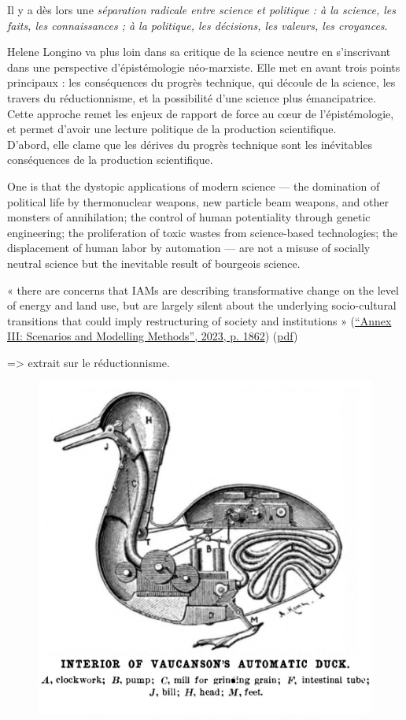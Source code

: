 Il y a dès lors une \emph{séparation radicale entre science et politique : à la science, les faits, les connaissances ; à la politique, les décisions, les valeurs, les croyances}. 


Helene Longino va plus loin dans sa critique de la science neutre en s'inscrivant dans une perspective d'épistémologie néo-marxiste. Elle met en avant trois points principaux : les conséquences du progrès technique, qui découle de la science, les travers du réductionnisme, et la possibilité d'une science plus émancipatrice. Cette approche remet les enjeux de rapport de force au cœur de l'épistémologie, et permet d'avoir une lecture politique de la production scientifique. \\

D'abord, elle clame que les dérives du progrès technique sont les inévitables conséquences de la production scientifique.

\begin{displayquote}
    One is that the dystopic applications of modern science — the domination of political life by thermonuclear weapons, new particle beam weapons, and other monsters of annihilation; the control of human potentiality through genetic engineering; the proliferation of toxic wastes from science-based technologies; the displacement of human labor by automation — are not a misuse of socially neutral science but the inevitable result of bourgeois science.
\end{displayquote}

« there are concerns that IAMs are describing transformative change on the level of energy and land use, but are largely silent about the underlying socio-cultural transitions that could imply restructuring of society and institutions » (\href{zotero://select/library/items/2SDDNUUF}{“Annex III: Scenarios and Modelling Methods”, 2023, p. 1862}) (\href{zotero://open-pdf/library/items/CHVFSLLH?page=22&annotation=JY4VBIZY}{pdf})



=> extrait sur le réductionnisme.

\begin{figure}
    \centering
    \includegraphics[width=0.6\linewidth]{reductionisme.png}
    \label{fig:reductionnisme}
\end{figure}

